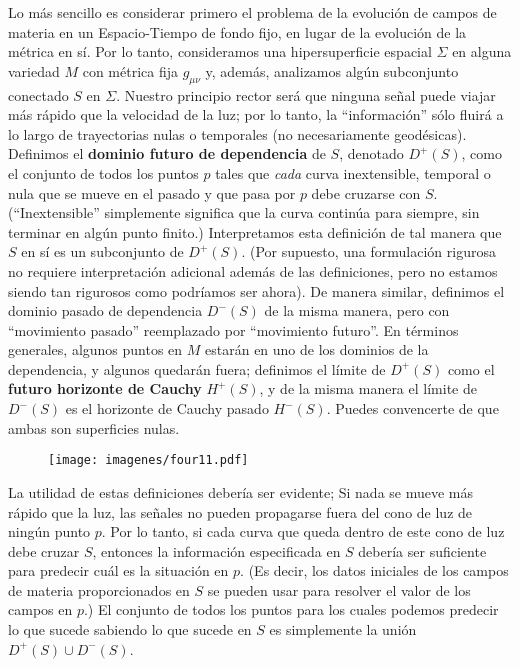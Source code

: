 \documentclass[11pt,b5paper,openany,twoside]{book}
\newcommand{\mn}{{\mu\nu}}
\begin{document}
Lo más sencillo es considerar primero el problema de la evolución de campos de materia en un Espacio-Tiempo de fondo fijo, en lugar de la evolución de la métrica en sí.
Por lo tanto, consideramos una hipersuperficie espacial $\Sigma$ en alguna variedad $M$ con métrica fija $g_\mn$ y, además, analizamos algún subconjunto conectado $S$ en $\Sigma$.
Nuestro principio rector será que ninguna señal puede viajar más rápido que la velocidad de la luz; por lo tanto, la ``información'' sólo fluirá a lo largo de trayectorias nulas o temporales (no necesariamente geodésicas).
Definimos el {\bf dominio futuro de dependencia} de $S$, denotado $D^+(S)$, como el conjunto de todos los puntos $p$ tales que {\it cada} curva inextensible, temporal o nula que se mueve en el pasado y que pasa por $p$ debe cruzarse con $S$.
(``Inextensible'' simplemente significa que la curva continúa para siempre, sin terminar en algún punto finito.)
Interpretamos esta definición de tal manera que $S$ en sí es un subconjunto de $D^+(S)$.
(Por supuesto, una formulación rigurosa no requiere interpretación adicional además de las definiciones, pero no estamos siendo tan rigurosos como podríamos ser ahora).
De manera similar, definimos el dominio pasado de dependencia $D^-(S)$ de la misma manera, pero con ``movimiento pasado'' reemplazado por ``movimiento futuro''. En términos generales, algunos puntos en $M$ estarán en uno de los dominios de la dependencia, y algunos quedarán fuera; definimos el límite de $D^+(S)$ como el {\bf futuro horizonte de Cauchy} $H^+(S)$, y de la misma manera el límite de $D^-(S)$ es el horizonte de Cauchy pasado $H^-(S)$.
Puedes convencerte de que ambas son superficies nulas.

\begin{figure}[h]
\centering
\texttt{[image: imagenes/four11.pdf]}
\end{figure}

La utilidad de estas definiciones debería ser evidente; Si nada se mueve más rápido que la luz, las señales no pueden propagarse fuera del cono de luz de ningún punto $p$.
Por lo tanto, si cada curva que queda dentro de este cono de luz debe cruzar $S$, entonces la información especificada en $S$ debería ser suficiente para predecir cuál es la situación en $p$.
(Es decir, los datos iniciales de los campos de materia proporcionados en $S$ se pueden usar para resolver el valor de los campos en $p$.)
El conjunto de todos los puntos para los cuales podemos predecir lo que sucede sabiendo lo que sucede en $S$ es simplemente la unión $D^+(S)\cup D^-(S)$.
\end{document}

